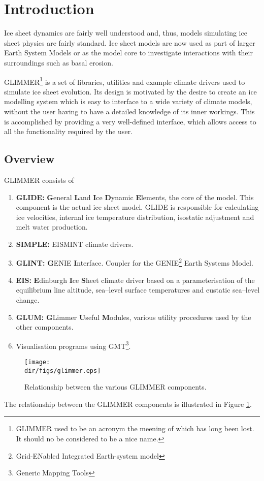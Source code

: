 \section{Introduction}
Ice sheet dynamics are fairly well understood and, thus, models simulating ice sheet physics are fairly standard. Ice sheet models are now used as part of larger Earth System Models or as the model core to investigate interactions with their surroundings such as basal erosion. 

GLIMMER\footnote{GLIMMER used to be an acronym the meening of which has long been lost. It should no be considered to be a nice name.} is a set of libraries, utilities and example climate drivers used to simulate ice sheet evolution. Its design is motivated by the desire to create an ice modelling system which is easy to interface to a wide variety of climate models, without the user having to have a detailed knowledge of its inner workings. This is accomplished by providing a very well-defined interface, which allows access to all the functionality required by the user.

\subsection{Overview}
GLIMMER consists of
\begin{enumerate}
\item {\bf GLIDE:} {\bf G}eneral {\bf L}and {\bf I}ce {\bf D}ynamic {\bf E}lements, the core of the model.  This component is the actual ice sheet model. GLIDE is responsible for calculating ice velocities, internal ice temperature distribution, isostatic adjustment and melt water production.
\item {\bf SIMPLE:} EISMINT climate drivers.
\item {\bf GLINT:} {\bf G}ENIE {\bf I}nterface. Coupler for the GENIE\footnote{Grid-ENabled Integrated Earth-system model} Earth Systems Model.
\item {\bf EIS:} {\bf E}dinburgh {\bf I}ce {\bf S}heet climate driver based on a parameterisation of the equilibrium line altitude, sea--level surface temperatures and eustatic sea--level change.
\item {\bf GLUM:} {\bf G}Limmer {\bf U}seful {\bf M}odules, various utility procedures used by the other components.
\item Visualisation programs using GMT\footnote{Generic Mapping Tools}.
\end{enumerate}
\begin{figure}[htbp]
  \centering
  \texttt{[image: \\dir/figs/glimmer.eps]}
  \caption{Relationship between the various GLIMMER components.}
  \label{ug.fig.glimmer}
\end{figure}
The relationship between the GLIMMER components is illustrated in Figure \ref{ug.fig.glimmer}.

